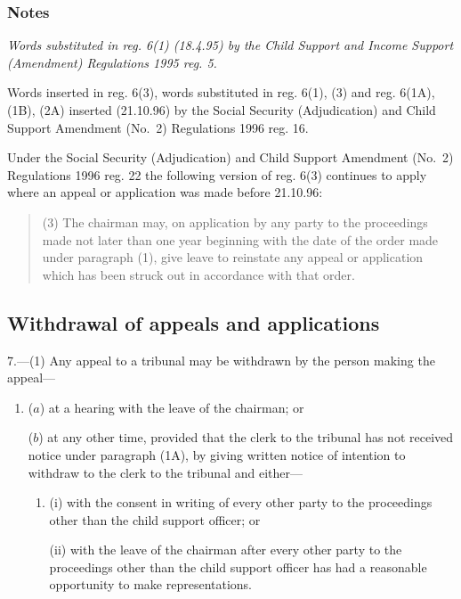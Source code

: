 \documentclass[a4paper]{article}
\newcommand\amendment[1]{\subsubsection*{Notes}{\itshape\frenchspacing\footnotesize #1 \par}}
\begin{document}
\amendment{
Words substituted in reg. 6(1) (18.4.95) by the Child Support and Income Support (Amendment) Regulations 1995 reg. 5.

Words inserted in reg. 6(3), words substituted in reg. 6(1), (3) and reg. 6(1A), (1B), (2A) inserted (21.10.96) by the Social Security (Adjudication) and Child Support Amendment (No.\ 2) Regulations 1996 reg. 16.

Under the Social Security (Adjudication) and Child Support Amendment (No.\ 2) Regulations 1996 reg. 22 the following version of reg. 6(3) continues to apply where an appeal or application was made before 21.10.96:
\begin{quotation}
(3) The chairman may, on application by any party to the proceedings made not later than one year beginning with the date of the order made under paragraph (1), give leave to reinstate any appeal or application which has been struck out in accordance with that order.
\end{quotation}
}

\subsection[7. Withdrawal of appeals and applications]{Withdrawal of appeals and applications}

7.—(1) Any appeal to a tribunal may be withdrawn by the person making the appeal---
\begin{enumerate}\item[]
($a$) at a hearing with the leave of the chairman; or

%

($b$) at any other time, provided that the clerk to the tribunal has not received notice under paragraph (1A), by giving written notice of intention to withdraw to the clerk to the tribunal and either—
\begin{enumerate}\item[]
(i) with the consent in writing of every other party to the proceedings other than the child support officer; or

(ii) with the leave of the chairman after every other party to the proceedings other than the child support officer has had a reasonable opportunity to make representations.
\end{enumerate}
\end{enumerate}
\end{document}
